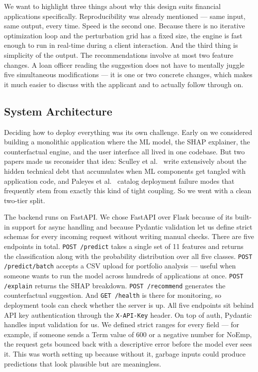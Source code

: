 We want to highlight three things about why this design suits financial applications specifically. Reproducibility was already mentioned --- same input, same output, every time. Speed is the second one. Because there is no iterative optimization loop and the perturbation grid has a fixed size, the engine is fast enough to run in real-time during a client interaction. And the third thing is simplicity of the output. The recommendations involve at most two feature changes. A loan officer reading the suggestion does not have to mentally juggle five simultaneous modifications --- it is one or two concrete changes, which makes it much easier to discuss with the applicant and to actually follow through on.

\subsection{System Architecture}

Deciding how to deploy everything was its own challenge. Early on we considered building a monolithic application where the ML model, the SHAP explainer, the counterfactual engine, and the user interface all lived in one codebase. But two papers made us reconsider that idea: Sculley et al.\ \cite{26} write extensively about the hidden technical debt that accumulates when ML components get tangled with application code, and Paleyes et al.\ \cite{27} catalog deployment failure modes that frequently stem from exactly this kind of tight coupling. So we went with a clean two-tier split.

The backend runs on FastAPI. We chose FastAPI over Flask because of its built-in support for async handling and because Pydantic validation let us define strict schemas for every incoming request without writing manual checks. There are five endpoints in total. \texttt{POST /predict} takes a single set of 11 features and returns the classification along with the probability distribution over all five classes. \texttt{POST /predict/batch} accepts a CSV upload for portfolio analysis --- useful when someone wants to run the model across hundreds of applications at once. \texttt{POST /explain} returns the SHAP breakdown. \texttt{POST /recommend} generates the counterfactual suggestion. And \texttt{GET /health} is there for monitoring, so deployment tools can check whether the server is up. All five endpoints sit behind API key authentication through the \texttt{X-API-Key} header. On top of auth, Pydantic handles input validation for us. We defined strict ranges for every field --- for example, if someone sends a Term value of 600 or a negative number for NoEmp, the request gets bounced back with a descriptive error before the model ever sees it. This was worth setting up because without it, garbage inputs could produce predictions that look plausible but are meaningless.

